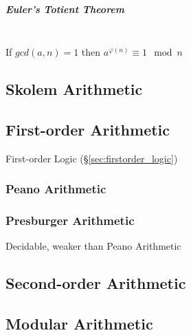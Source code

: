 \subparagraph{Euler's Totient Theorem}\label{sec:totient_theorem}
\hfill \\

If $gcd(a,n) = 1$ then $a^{\varphi(n)} \equiv 1 \mod n$



\subsection{Skolem Arithmetic}\label{sec:skolem_arithmetic}
\cite{skolem23}

\subsection{First-order Arithmetic}\label{sec:firstorder_arithmetic}

First-order Logic (\S\ref{sec:firstorder_logic})



\subsubsection{Peano Arithmetic}\label{sec:peano_arithmetic}

\subsubsection{Presburger Arithmetic}\label{sec:presburger_arithmetic}

Decidable, weaker than Peano Arithmetic



\subsection{Second-order Arithmetic}\label{sec:second_order_arithmetic}

\subsection{Modular Arithmetic}\label{sec:modular_arithmetic}

